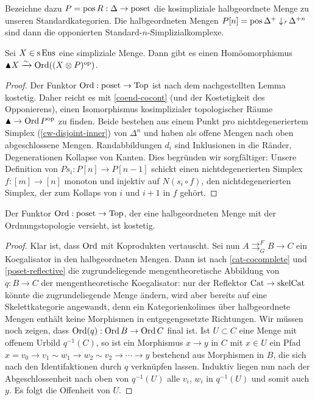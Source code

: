 Bezeichne dazu $P = \operatorname{pos} R: \Delta \to \operatorname{poset}$ die kosimpliziale
halbgeordnete Menge zu unseren Standardkategorien. Die halbgeordneten
Mengen $P[n] = \operatorname{pos} \Delta^+ \downarrow \! {\scriptstyle r} \, \Delta^{+n}$ sind dann die
opponierten Standard-$n$-Simplizialkomplexe.
\begin{prop} \label{clumsy-order-top}
  Sei $X \in \operatorname{s}\operatorname{Ens}$ eine simpliziale Menge. Dann gibt es einen
  Homöomorphismus $\blacktriangle X \xrightarrow[]{\sim} \operatorname{Ord}((X \otimes P)^\mathrm{op})$.
\end{prop}
\begin{proof}
  Der Funktor $\operatorname{Ord}: \operatorname{poset} \to \operatorname{Top}$ ist nach dem nachgestellten
  Lemma kostetig. Daher reicht es mit \ref{coend-cocont} (und der
  Kostetigkeit des Opponierens), einen Isomorphismus kosimplizialer
  topologischer Räume $\blacktriangle \to \operatorname{Ord} P^\mathrm{op}$ zu finden. Beide
  bestehen aus einem Punkt pro nichtdegeneriertem Simplex
  (\ref{cw-disjoint-inner}) von $\Delta^n$ und haben als offene Mengen
  nach oben abgeschlossene Mengen. Randabbildungen $d_i$ sind
  Inklusionen in die Ränder, Degenerationen Kollapse von Kanten. Dies
  begründen wir sorgfältiger: Unsere Definition von $Ps_i: P[n] \to
  P[n-1]$ schickt einen nichtdegenerierten Simplex $f: [m] \to [n]$
  monoton und injektiv auf $N(s_i \circ f)$, den nichtdegenerierten
  Simplex, der zum Kollaps von $i$ und $i+1$ in $f$ gehört.
\end{proof}
\begin{lemma}
  Der Funktor $\operatorname{Ord}: \operatorname{poset} \to \operatorname{Top}$, der eine halbgeordneten Menge
  mit der Ordnungstopologie versieht, ist kostetig.
\end{lemma}
\begin{proof}
    Klar ist, dass $\operatorname{Ord}$ mit Koprodukten vertauscht. Sei nun $A
    \mathrel{\mathop{\rightrightarrows}^{F}_{G}} B \to C$ ein
    Koegalisator in den halbgeordneten Mengen. Dann ist nach
    \ref{cat-cocomplete} und \ref{poset-reflective} die
    zugrundeliegende mengentheoretische Abbildung von $q: B \to C$ der
    mengentheoretische Koegalisator: nur der Reflektor $\operatorname{Cat} \to
    \mathrm{skelCat}$ könnte die zugrundeliegende Menge ändern, wird
    aber bereits auf eine Skelettkategorie angewandt, denn ein
    Kategorienkolimes über halbgeordnete Mengen enthält keine
    Morphismen in entgegengesetzte Richtungen. Wir müssen noch zeigen,
    dass $\operatorname{Ord}(q): \operatorname{Ord} B \to \operatorname{Ord} C$ final ist. Ist $U \subset C$
    eine Menge mit offenem Urbild $q^{-1}(C)$, so ist ein Morphismus
    $x \to y$ in $C$ mit $x \in U$ ein Pfad $x = v_0 \to v_1 \sim w_1
    \to w_2 \sim v_2 \to \cdots \to y$ bestehend aus Morphismen in
    $B$, die sich nach den Identifaktionen durch $q$ verknüpfen
    lassen. Induktiv liegen nun nach der Abgeschlossenheit nach oben
    von $q^{-1}(U)$ alle $v_i$, $w_i$ in $q^{-1}(U)$ und somit auch
    $y$. Es folgt die Offenheit von $U$.
\end{proof}

